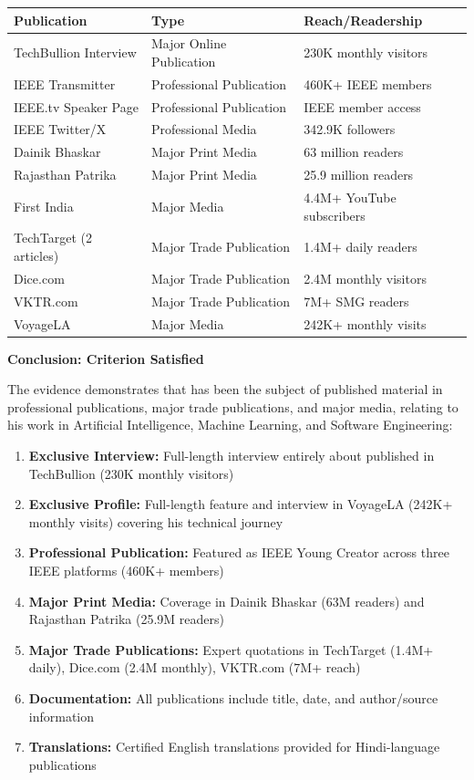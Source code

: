 \begin{center}
\begin{tabular}{|l|l|l|}
\hline
\textbf{Publication} & \textbf{Type} & \textbf{Reach/Readership} \\
\hline
TechBullion Interview & Major Online Publication & 230K monthly visitors \\
\hline
IEEE Transmitter & Professional Publication & 460K+ IEEE members \\
\hline
IEEE.tv Speaker Page & Professional Publication & IEEE member access \\
\hline
IEEE Twitter/X & Professional Media & 342.9K followers \\
\hline
Dainik Bhaskar & Major Print Media & 63 million readers \\
\hline
Rajasthan Patrika & Major Print Media & 25.9 million readers \\
\hline
First India & Major Media & 4.4M+ YouTube subscribers \\
\hline
TechTarget (2 articles) & Major Trade Publication & 1.4M+ daily readers \\
\hline
Dice.com & Major Trade Publication & 2.4M monthly visitors \\
\hline
VKTR.com & Major Trade Publication & 7M+ SMG readers \\
\hline
VoyageLA & Major Media & 242K+ monthly visits \\
\hline
\end{tabular}
\end{center}

\textbf{Conclusion: Criterion Satisfied}

The evidence demonstrates that \dr has been the subject of published material in professional publications, major trade publications, and major media, relating to his work in Artificial Intelligence, Machine Learning, and Software Engineering:

\begin{enumerate}
    \item [$\checkmark$] \textbf{Exclusive Interview:} Full-length interview entirely about \dr published in TechBullion (230K monthly visitors)
    \item [$\checkmark$] \textbf{Exclusive Profile:} Full-length feature and interview in VoyageLA (242K+ monthly visits) covering his technical journey
    \item [$\checkmark$] \textbf{Professional Publication:} Featured as IEEE Young Creator across three IEEE platforms (460K+ members)
    \item [$\checkmark$] \textbf{Major Print Media:} Coverage in Dainik Bhaskar (63M readers) and Rajasthan Patrika (25.9M readers)
    \item [$\checkmark$] \textbf{Major Trade Publications:} Expert quotations in TechTarget (1.4M+ daily), Dice.com (2.4M monthly), VKTR.com (7M+ reach)
    \item [$\checkmark$] \textbf{Documentation:} All publications include title, date, and author/source information
    \item [$\checkmark$] \textbf{Translations:} Certified English translations provided for Hindi-language publications
\end{enumerate}

